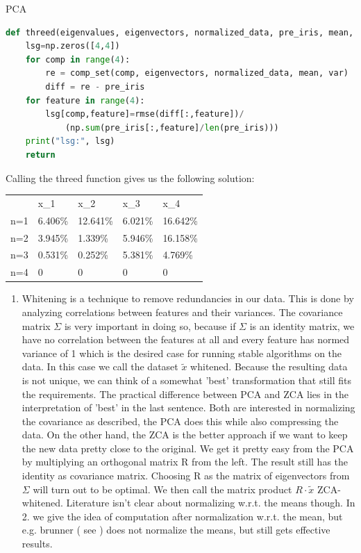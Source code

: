 \begin{task}[]{PCA}
\begin{subtask}
\begin{lstlisting}[language=python]
def threed(eigenvalues, eigenvectors, normalized_data, pre_iris, mean, var):
	lsg=np.zeros([4,4])
	for comp in range(4):
		re = comp_set(comp, eigenvectors, normalized_data, mean, var)
		diff = re - pre_iris
	for feature in range(4):
		lsg[comp,feature]=rmse(diff[:,feature])/
			(np.sum(pre_iris[:,feature]/len(pre_iris)))
	print("lsg:", lsg)
	return 
\end{lstlisting}
Calling the threed function gives us the following solution:
\begin{table}[H]
	\begin{tabular}{lllll}
		& x\_1    & x\_2     & x\_3    & x\_4     \\
		n=1 & 6.406\% & 12.641\% & 6.021\% & 16.642\% \\
		n=2 & 3.945\% & 1.339\%  & 5.946\% & 16.158\% \\
		n=3 & 0.531\% & 0.252\%  & 5.381\% & 4.769\%  \\
		n=4 & 0       & 0        & 0       & 0       
	\end{tabular}
\end{table}
\end{subtask}
\begin{subtask}
	\begin{enumerate}
		\item
	Whitening is a technique to remove redundancies in our data. This is done by analyzing correlations between features and their variances. The covariance matrix $\Sigma$ is very important in doing so, because if $\Sigma$ is an identity matrix, we have no correlation between the features at all and every feature has normed variance of 1 which is the desired case for running stable algorithms on the data. In this case we call the dataset $\tilde{x}$ whitened. Because the resulting data is not unique, we can think of a somewhat 'best' transformation that still fits the requirements. The practical difference between PCA and ZCA lies in the interpretation of 'best' in the last sentence. Both are interested in normalizing the covariance as described, the PCA does this while also compressing the data. On the other hand, the ZCA is the better approach if we want to keep the new data pretty close to the original. We get it pretty easy from the PCA by multiplying an orthogonal matrix R from the left. The result still has the identity as covariance matrix. Choosing R as the matrix of eigenvectors from $\Sigma$ will turn out to be optimal. We then call the matrix product $R\cdot\tilde{x}$ ZCA-whitened. Literature isn't clear about normalizing w.r.t. the means though. In 2. we give the idea of computation after normalization w.r.t. the mean, but e.g. brunner ( see ) does not normalize the means, but still gets effective results.

\end{enumerate}
\end{subtask}
\end{task}
